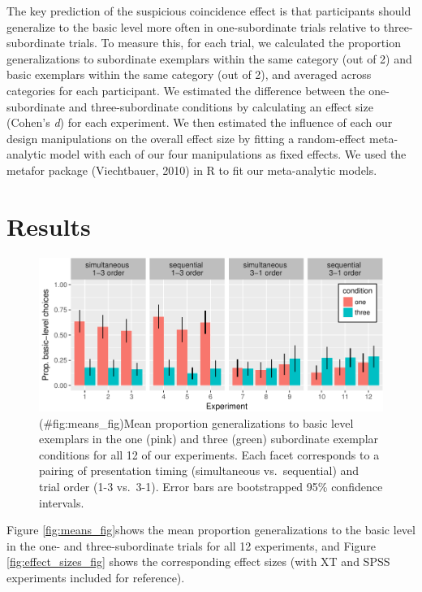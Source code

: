 \documentclass[english,floatsintext,man]{apa6}
\theoremstyle{definition}
\theoremstyle{definition}
\theoremstyle{remark}
\begin{document}
The key prediction of the suspicious coincidence effect is that
participants should generalize to the basic level more often in
one-subordinate trials relative to three-subordinate trials. To measure
this, for each trial, we calculated the proportion generalizations to
subordinate exemplars within the same category (out of 2) and basic
exemplars within the same category (out of 2), and averaged across
categories for each participant. We estimated the difference between the
one-subordinate and three-subordinate conditions by calculating an
effect size (Cohen's \emph{d}) for each experiment. We then estimated
the influence of each our design manipulations on the overall effect
size by fitting a random-effect meta-analytic model with each of our
four manipulations as fixed effects. We used the metafor package
(Viechtbauer, 2010) in R to fit our meta-analytic models.

\section{Results}\label{results}

\begin{figure}
\centering
\includegraphics{xtmem_files/figure-latex/means_fig-1.pdf}
\caption{(\#fig:means\_fig)Mean proportion generalizations to basic
level exemplars in the one (pink) and three (green) subordinate exemplar
conditions for all 12 of our experiments. Each facet corresponds to a
pairing of presentation timing (simultaneous vs.~sequential) and trial
order (1-3 vs.~3-1). Error bars are bootstrapped 95\% confidence
intervals.}
\end{figure}

Figure \ref{fig:means_fig}shows the mean proportion generalizations to
the basic level in the one- and three-subordinate trials for all 12
experiments, and Figure \ref{fig:effect_sizes_fig} shows the
corresponding effect sizes (with XT and SPSS experiments included for
reference).
\end{document}

